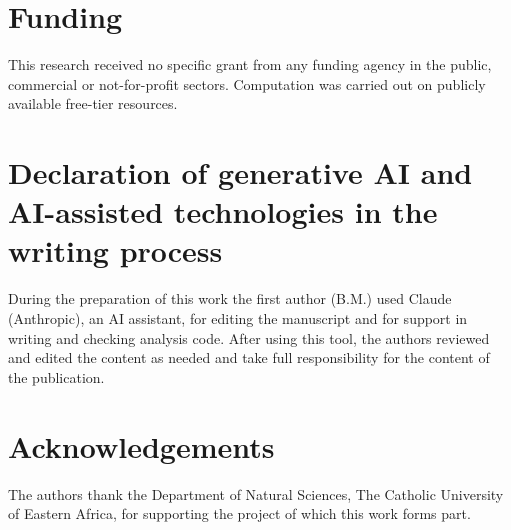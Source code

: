 \documentclass[preprint,12pt]{elsarticle}
\begin{document}
\section*{Funding}

This research received no specific grant from any funding agency in the public, commercial or
not-for-profit sectors. Computation was carried out on publicly available free-tier resources.

\section*{Declaration of generative AI and AI-assisted technologies in the writing process}

During the preparation of this work the first author (B.M.) used Claude (Anthropic), an AI
assistant, for editing the manuscript and for support in writing and checking analysis code.
After using this tool, the authors reviewed and edited the content as needed and take full
responsibility for the content of the publication.

\section*{Acknowledgements}

The authors thank the Department of Natural Sciences, The Catholic University of Eastern
Africa, for supporting the project of which this work forms part.
\end{document}
